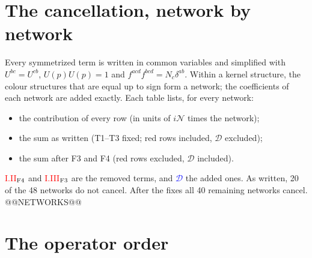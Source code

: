 \documentclass[10pt]{article}
\numberwithin{equation}{section}
\newcommand{\NN}{\mathcal N}
\begin{document}
\section{The cancellation, network by network}\label{sec:networks}
Every symmetrized term is written in common variables and simplified with $U^{bc}=U^{cb}$, $U(p)U(p)=1$ and $f^{acd}f^{bcd}=N_c\delta^{ab}$. Within a kernel structure, the colour structures that are equal up to sign form a network; the coefficients of each network are added exactly. Each table lists, for every network:
\begin{itemize}
\item the contribution of every row (in units of $i\NN$ times the network);
\item the sum as written (T1--T3 fixed; red rows included, $\mathcal D$ excluded);
\item the sum after F3 and F4 (red rows excluded, $\mathcal D$ included).
\end{itemize}
\textcolor{red}{I.II$_{\rm F4}$} and \textcolor{red}{I.III$_{\rm F3}$} are the removed terms, and \textcolor{blue}{$\mathcal D$} the added ones. As written, 20 of the 48 networks do not cancel. After the fixes all 40 remaining networks cancel.
@@NETWORKS@@

\section{The operator order}\label{sec:order}
\end{document}
